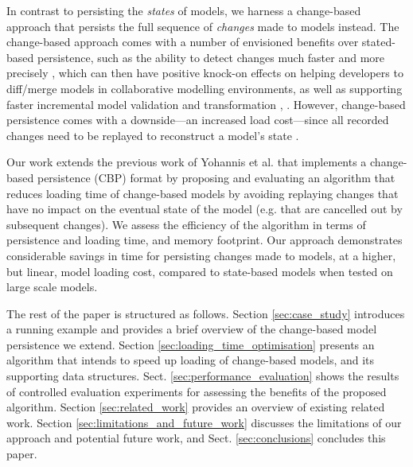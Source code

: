 \documentclass{llncs}
\begin{document}
In contrast to persisting the \emph{states} of models, we harness a change-based approach that persists the full sequence of \emph{changes} made to models instead. The change-based approach comes with a number of envisioned benefits over stated-based persistence, such as the ability to detect changes much faster and more precisely \cite{yohannis2017turning}, which can then have positive knock-on effects on helping developers to diff/merge models in collaborative modelling environments, as well as supporting faster incremental model validation and transformation \cite{rath2012derived}, \cite{ogunyomi2015property}. However, change-based persistence comes with a downside---an increased load cost---since all recorded changes need to be replayed to reconstruct a model's state \cite{yohannis2017turning}.   

Our work extends the previous work of Yohannis et al. \cite{yohannis2017turning} that implements a change-based persistence (CBP) format by proposing and evaluating an algorithm that reduces loading time of change-based models by avoiding replaying changes that have no impact on the eventual state of the model (e.g. that are cancelled out by subsequent changes). We assess the efficiency of the algorithm in terms of persistence and loading time, and memory footprint. Our approach demonstrates considerable savings in time for persisting changes made to models, at a higher, but linear, model loading cost, compared to state-based models when tested on large scale models. %

The rest of the paper is structured as follows. Section \ref{sec:case_study} introduces a running example and provides a brief overview of the change-based model persistence we extend. Section \ref{sec:loading_time_optimisation} presents an algorithm that intends to speed up loading of change-based models, and its supporting data structures. %
Sect. \ref{sec:performance_evaluation} shows the results of controlled evaluation experiments for assessing the benefits of the proposed algorithm. Section \ref{sec:related_work} provides an overview of existing related work. Section \ref{sec:limitations_and_future_work} discusses the limitations of our approach and potential future work, and Sect. \ref{sec:conclusions} concludes this paper.
\end{document}
